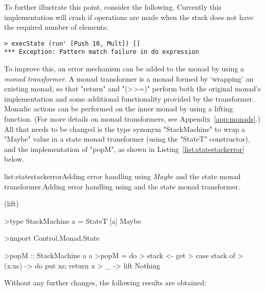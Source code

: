 To further illustrate this point, consider the following. Currently this implementation will crash if operations are made when the stack does not have the required number of elements:

\begin{verbatim}
> execState (run' [Push 10, Mult]) []
*** Exception: Pattern match failure in do expression
\end{verbatim}

\noindent To improve this, an error mechanism can be added to the monad by using a \emph{monad transformer}. A monad transformer is a monad formed by `wrapping' an existing monad, so that "return" and "(>>=)" perform both the original monad's implementation and some additional functionality provided by the transformer. Monadic actions can be performed on the inner monad by using a lifting function. (For more details on monad transformers, see Appendix~\ref{app:monads}.) All that needs to be changed is the type synonym "StackMachine" to wrap a "Maybe" value in a state monad transformer (using the "StateT" constructor), and the implementation of "popM", as shown in Listing~\ref{list:statestackerror} below.

\vspace{-0.5em}
\begin{listing}{list:statestackerror}{Adding error handling using \emph{Maybe} and the state monad transformer.}{Adding error handling using  and the state monad transformer.}{}
\end{listing}\vspace{-1.5em}

\functions(lift)
\begin{haskell}

>type StackMachine a = StateT [a] Maybe

>import Control.Monad.State

>popM :: StackMachine a a
>popM = do
>  stack <- get
>  case stack of
>    (x:xs) -> do put xs; return x
>    _ -> lift Nothing


\end{haskell}
\noindent Without any further changes, the following results are obtained:

